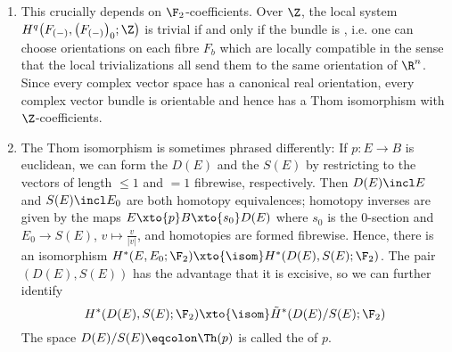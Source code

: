 \begin{remark}
	\leavevmode
	\begin{enumerate}
		\item This crucially depends on $\F_2$-coefficients.
			Over $\Z$, the local system $H^q\big(F_{({{-}})}, \big(F_{({{-}})}\big)_0; \Z\big)$ is trivial if and only if the bundle is , i.e. one can choose orientations on each fibre $F_b$ which are locally compatible in the sense that the local trivializations all send them to the same orientation of $\R^n$.
			Since every complex vector space has a canonical real orientation, every complex vector bundle is orientable and hence has a Thom isomorphism with $\Z$-coefficients.
		\item The Thom isomorphism is sometimes phrased differently:
			If $p\colon E \to B$ is euclidean, we can form the  $D(E)$ and the  $S(E)$ by restricting to the vectors of length $\leq 1$ and $= 1$ fibrewise, respectively.
			Then $D(E) \incl E$ and $S(E) \incl E_0$ are both homotopy equivalences; homotopy inverses are given by the maps $E \xto{p} B \xto{s_0} D(E)$ where $s_0$ is the 0-section and $E_0 \to S(E)$, $v \mapsto \frac{v}{|v|}$, and homotopies are formed fibrewise.
			Hence, there is an isomorphism $H^*(E, E_0; \F_2) \xto{\isom} H^*(D(E), S(E); \F_2)$.
			The pair $(D(E), S(E))$ has the advantage that it is excisive, so we can further identify
			\begin{equation*}
				H^*(D(E), S(E); \F_2) \xto{\isom} \tilde{H}^*(D(E) / S(E); \F_2)
			\end{equation*}
			The space $D(E) / S(E) \eqcolon \Th(p)$ is called the  of $p$.
	\end{enumerate}
\end{remark}
